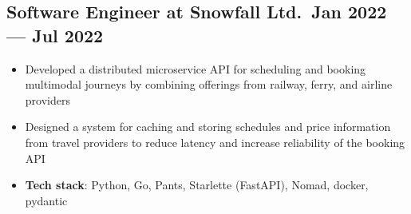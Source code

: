 \documentclass{article}
\begin{document}
\subsection{Software Engineer at Snowfall Ltd.\ \hfill Jan 2022 --- Jul 2022}
\begin{itemize}
  \itemsep0em
  \item Developed a distributed microservice API for scheduling and booking multimodal journeys by combining offerings from railway, ferry, and airline providers
  \item Designed a system for caching and storing schedules and price information from travel providers to reduce latency and increase reliability of the booking API
  \item {\bfseries Tech stack}: Python, Go, Pants, Starlette (FastAPI), Nomad, docker, pydantic
\end{itemize}
\end{document}
